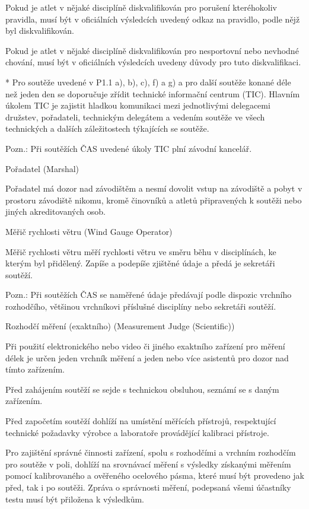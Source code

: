 Pokud je atlet v nějaké disciplíně diskvalifikován pro porušení kteréhokoliv pravidla, musí být v oficiálních výsledcích uvedený odkaz na pravidlo, podle nějž byl diskvalifikován.

Pokud je atlet v nějaké disciplíně diskvalifikován pro nesportovní nebo nevhodné chování, musí být v oficiálních výsledcích uvedeny důvody pro tuto diskvalifikaci.

* Pro soutěže uvedené v P1.1 a), b), c), f) a g) a pro další soutěže konané déle než jeden den se doporučuje zřídit technické informační centrum (TIC). Hlavním úkolem TIC je zajistit hladkou komunikaci mezi jednotlivými delegacemi družstev, pořadateli, technickým delegátem a vedením soutěže ve všech technických a dalších záležitostech týkajících se soutěže.

Pozn.: Při soutěžích ČAS uvedené úkoly TIC  plní závodní kancelář.
\enditems

\secc Pořadatel (Marshal)

Pořadatel má dozor nad závodištěm a nesmí dovolit vstup na závodiště a pobyt v prostoru závodiště nikomu, kromě činovníků a atletů připravených k soutěži nebo jiných akreditovaných osob.

\secc Měřič rychlosti větru (Wind Gauge Operator)

Měřič rychlosti větru měří rychlosti větru ve směru běhu v disciplínách, ke kterým byl přidělený.
Zapíše a podepíše zjištěné údaje a předá je sekretáři soutěží.

Pozn.: Při soutěžích ČAS se naměřené údaje předávají podle dispozic vrchního rozhodčího, většinou vrchníkovi příslušné disciplíny nebo sekretáři soutěží.

\secc Rozhodčí měření (exaktního) (Measurement Judge (Scientific))

Při použití elektronického nebo video či jiného exaktního zařízení pro měření délek je určen jeden vrchník měření a jeden nebo více asistentů pro dozor nad tímto zařízením.

Před zahájením soutěží se sejde s technickou obsluhou, seznámí se s daným zařízením.

Před započetím soutěží dohlíží na umístění měřících přístrojů, respektující technické požadavky výrobce a laboratoře provádějící kalibraci přístroje.

Pro zajištění správné činnosti zařízení, spolu s rozhodčími a vrchním rozhodčím pro soutěže v poli, dohlíží na srovnávací měření s výsledky získanými měřením pomocí kalibrovaného a ověřeného ocelového pásma, které musí být provedeno jak před, tak i po soutěži.
Zpráva o správnosti měření, podepsaná všemi účastníky testu musí být přiložena k výsledkům.


